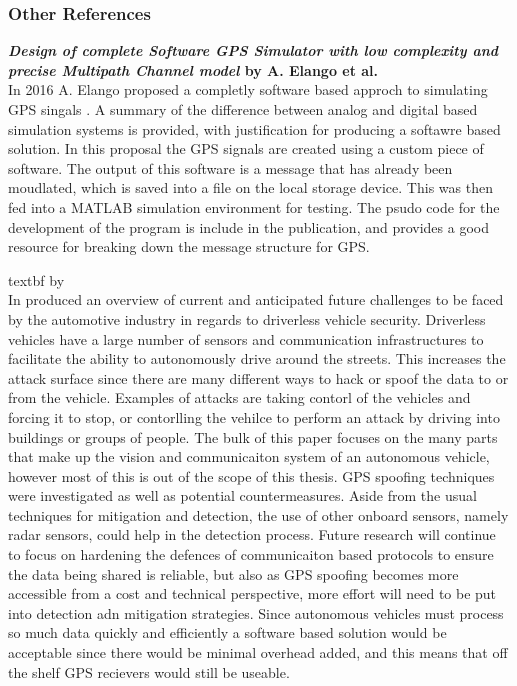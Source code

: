 
\subsubsection{Other References}

\textbf{\emph{Design of complete Software GPS Simulator with low complexity and precise Multipath Channel model} by A. Elango et al.} \\ 
In 2016 A. Elango proposed a completly software based approch to simulating GPS singals \cite{RN15}. A summary of the difference between analog
and digital based simulation systems is provided, with justification for producing a softawre based solution. In this proposal the GPS signals are created
using a custom piece of software. The output of this software is a message that has already been moudlated, which is saved into a file on the local
storage device. This was then fed into a MATLAB simulation environment for testing. The psudo code for the development of the program is include in
the publication, and provides a good resource for breaking down the message structure for GPS.

\medskip

textbf{\emph{} by \citeauthor{RN25}} \\
In \citeyear{RN25} \citeauthor{RN25} \cite{RN25} produced an overview of current and anticipated future challenges to be faced by the automotive industry in regards to
driverless vehicle security. Driverless vehicles have a large number of sensors and communication infrastructures to facilitate the ability to autonomously drive around
the streets. This increases the attack surface since there are many different ways to hack or spoof the data to or from the vehicle. Examples of attacks are taking
contorl of the vehicles and forcing it to stop, or contorlling the vehilce to perform an attack by driving into buildings or groups of people. The bulk of this paper
focuses on the many parts that make up the vision and communicaiton system of an autonomous vehicle, however most of this is out of the scope of this thesis. GPS spoofing
techniques were investigated as well as potential countermeasures. Aside from the usual techniques for mitigation and detection, the use of other onboard sensors, namely
radar sensors, could help in the detection process. Future research will continue to focus on hardening the defences of communicaiton based protocols to ensure the data
being shared is reliable, but also as GPS spoofing becomes more accessible from a cost and technical perspective, more effort will need to be put into detection adn
mitigation strategies. Since autonomous vehicles must process so much data quickly and efficiently a software based solution would be acceptable since there would be
minimal overhead added, and this means that off the shelf GPS recievers would still be useable. 

